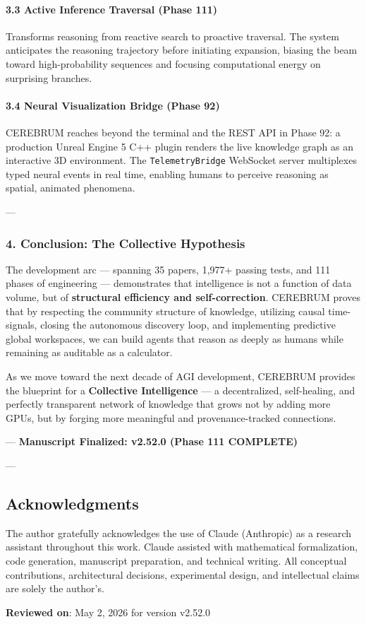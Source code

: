 \paragraph{3.3 Active Inference Traversal (Phase 111)}
Transforms reasoning from reactive search to proactive traversal. The system anticipates the reasoning trajectory before initiating expansion, biasing the beam toward high-probability sequences and focusing compu\-tational energy on surprising branches.

\paragraph{3.4 Neural Visual\-ization Bridge (Phase 92)}
CEREBRUM reaches beyond the terminal and the REST API in Phase 92: a production Unreal Engine 5 C++ plugin renders the live knowledge graph as an interactive 3D environment. The \texttt{TelemetryBridge} WebSocket server multiplexes typed neural events in real time, enabling humans to perceive reasoning as spatial, animated phenomena.

---

\subsubsection{4. Conclusion: The Collective Hypothesis}
The development arc — spanning 35 papers, 1,977+ passing tests, and 111 phases of engineering — demon\-strates that intel\-ligence is not a function of data volume, but of \textbf{structural efficiency and self-correction}. CEREBRUM proves that by respecting the community structure of knowledge, utilizing causal time-signals, closing the autonomous discovery loop, and imple\-menting predictive global workspaces, we can build agents that reason as deeply as humans while remaining as auditable as a calculator.

As we move toward the next decade of AGI development, CEREBRUM provides the blueprint for a \textbf{Collective Intell\-igence} — a decen\-tralized, self-healing, and perfectly transparent network of knowledge that grows not by adding more GPUs, but by forging more meaningful and provenance-tracked connections.

---
\textbf{Manuscript Finalized: v2.52.0 (Phase 111 COMPLETE)}

---
\subsection{Acknow\-ledgments}

The author gratefully ackno\-wledges the use of Claude (Anthropic) as a research assistant throughout this work. Claude assisted with mathe\-matical forma\-lization, code generation, manuscript preparation, and technical writing. All conceptual contr\-ibutions, archi\-tectural decisions, exper\-imental design, and intel\-lectual claims are solely the author's.

\textbf{Reviewed on}: May 2, 2026 for version v2.52.0

